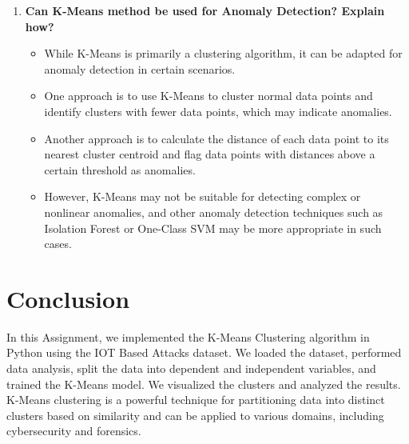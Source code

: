 \documentclass[11pt]{article}
\begin{document}
\begin{enumerate}
    \item \textbf{Can K-Means method be used for Anomaly Detection? Explain how?}
          \begin{itemize}
              \item While K-Means is primarily a clustering algorithm, it can be adapted for anomaly detection in certain scenarios.
              \item One approach is to use K-Means to cluster normal data points and identify clusters with fewer data points, which may indicate anomalies.
              \item Another approach is to calculate the distance of each data point to its nearest cluster centroid and flag data points with distances above a certain threshold as anomalies.
              \item However, K-Means may not be suitable for detecting complex or nonlinear anomalies, and other anomaly detection techniques such as Isolation Forest or One-Class SVM may be more appropriate in such cases.
          \end{itemize}
\end{enumerate}


\section{Conclusion}
In this Assignment, we implemented the K-Means Clustering algorithm in Python using the IOT Based Attacks dataset. We loaded the dataset, performed data analysis, split the data into dependent and independent variables, and trained the K-Means model. We visualized the clusters and analyzed the results. K-Means clustering is a powerful technique for partitioning data into distinct clusters based on similarity and can be applied to various domains, including cybersecurity and forensics.
\clearpage

\pagebreak



\end{document}
